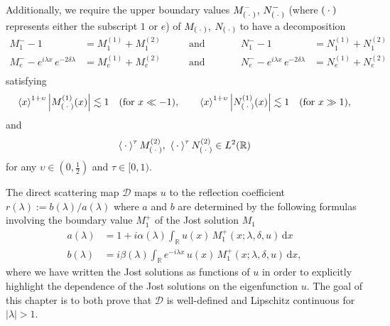 \documentclass[../dissertation.tex]{subfiles}
\begin{document}
\begin{defn}
	Additionally, we require the upper boundary values $M_{(\kern 0.5ex \cdot \kern 0.5ex)}^-$, $N_{(\kern 0.5ex \cdot \kern 0.5ex)}^-$
	(where $(\kern 0.5ex \cdot \kern 0.5ex)$ represents either the subscript $1$ or $e$) of 
	$M_{(\kern 0.5ex \cdot \kern 0.5ex)}$, $N_{(\kern 0.5ex \cdot \kern 0.5ex)}$ to have a decomposition 
	\begin{align*}
		M_1^- - 1 &= M_1^{(1)} + M_1^{(2)} \qquad &\text{and}& \qquad
		&N_1^- - 1 &= N_1^{(1)} + N_1^{(2)} \\
		M_e^- - e^{i\lambda x}\,e^{-2\delta\lambda} &= M_e^{(1)} + M_e^{(2)} \qquad &\text{and}& \qquad
		&N_e^- - e^{i\lambda x}\,e^{-2\delta\lambda} &= N_e^{(1)} + N_e^{(2)} \\
	\end{align*}
	satisfying 
	\begin{align*}
		\left\langle x \right\rangle^{1+\upsilon} \left|M_{(\kern 0.5ex \cdot \kern 0.5ex)}^{(1)}(x)\right| \lesssim 1 
			\quad (\text{for } x \ll -1), \qquad 
		\left\langle x \right\rangle^{1+\upsilon} \left|N_{(\kern 0.5ex \cdot \kern 0.5ex)}^{(1)}(x)\right| \lesssim 1
			\quad (\text{for } x \gg 1),
	\end{align*}
	and
	\begin{align*}
		\left\langle \kern 0.5ex \cdot \kern 0.5ex \right\rangle^\tau M_{(\kern 0.5ex \cdot \kern 0.5ex)}^{(2)}, 
			~\left\langle \kern 0.5ex \cdot \kern 0.5ex \right\rangle^\tau N_{(\kern 0.5ex \cdot \kern 0.5ex)}^{(2)} \in L^2(\mathbb R)
	\end{align*}
	for any $\upsilon \in \left(0,\frac{1}{2}\right)$ and $\tau \in [0,1)$.
\end{defn}

The direct scattering map 
$\mathscr D$ maps $u$ to the reflection coefficient 
$r(\lambda) := b(\lambda) / a(\lambda)$ where $a$ and $b$ are determined by 
the following formulas involving the boundary value $M_1^+$ of the Jost solution
$M_1$
\begin{subequations}
	\label{eq3:ScatData}
	\begin{align}
		\label{eq3:ScatDataA}
		a(\lambda) 
			&= 1 + i \alpha(\lambda) 
				\int_{\mathbb R} 
					u(x) \, M_1^+(x;\lambda, \delta, u) 
				\, \mathrm{d}x \\
		\label{eq3:ScatDataB}
		b(\lambda)
			&= i \beta(\lambda) 
				\int_{\mathbb R} 
					e^{-i\lambda x} \, u(x) \, M_1^+(x; \lambda, \delta, u)
				\, \mathrm{d}x,
	\end{align}
\end{subequations}
where we have written the Jost solutions as functions of $u$ in order to 
explicitly highlight the dependence of the Jost solutions on the eigenfunction $u$.
The goal of this chapter is to both prove that $\mathscr D$ is well-defined and
Lipschitz continuous for $|\lambda| > 1$.
\end{document}

